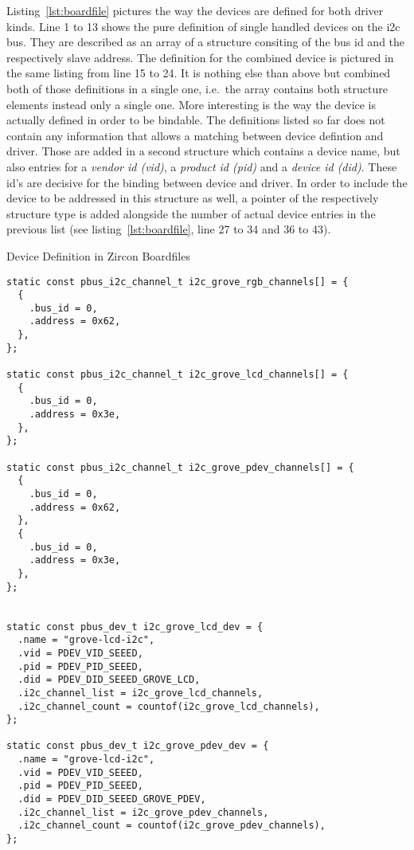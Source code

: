 Listing~\ref{lst:boardfile} pictures the way the devices are defined for both driver kinds.
Line 1 to 13 shows the pure definition of single handled devices on the \ac{i2c} bus.
They are described as an array of a structure consiting of the bus id and the respectively slave address.
The definition for the combined device is pictured in the same listing from line 15 to 24. 
It is nothing else than above but combined both of those definitions in a single one, i.e.\ the array contains both structure elements instead only a single one.
More interesting is the way the device is actually defined in order to be bindable.
The definitions listed so far does not contain any information that allows a matching between device defintion and driver.
Those are added in a second structure which contains a device name, but also entries for a \textit{vendor id (vid)}, a \textit{product id (pid)} and a \textit{device id (did)}.
These id's are decisive for the binding between device and driver.
In order to include the device to be addressed in this structure as well, a pointer of the respectively structure type is added alongside the number of actual device entries in the previous list (see listing~\ref{lst:boardfile}, line 27 to 34 and 36 to 43).

\begin{listing} [H]
\caption{Device Definition in Zircon Boardfiles}
\label{lst:boardfile}
\begin{verbatim}
static const pbus_i2c_channel_t i2c_grove_rgb_channels[] = {
  {
    .bus_id = 0,
    .address = 0x62,
  },
};

static const pbus_i2c_channel_t i2c_grove_lcd_channels[] = {
  {
    .bus_id = 0,
    .address = 0x3e,
  },
}; 

static const pbus_i2c_channel_t i2c_grove_pdev_channels[] = {
  {
    .bus_id = 0,
    .address = 0x62,
  },
  {
    .bus_id = 0,
    .address = 0x3e,
  },
};


static const pbus_dev_t i2c_grove_lcd_dev = {
  .name = "grove-lcd-i2c",
  .vid = PDEV_VID_SEEED,              
  .pid = PDEV_PID_SEEED,              
  .did = PDEV_DID_SEEED_GROVE_LCD,    
  .i2c_channel_list = i2c_grove_lcd_channels,
  .i2c_channel_count = countof(i2c_grove_lcd_channels),
}; 

static const pbus_dev_t i2c_grove_pdev_dev = {
  .name = "grove-lcd-i2c",
  .vid = PDEV_VID_SEEED,              
  .pid = PDEV_PID_SEEED,              
  .did = PDEV_DID_SEEED_GROVE_PDEV,  
  .i2c_channel_list = i2c_grove_pdev_channels,
  .i2c_channel_count = countof(i2c_grove_pdev_channels),
};
\end{verbatim}
\end{listing}

